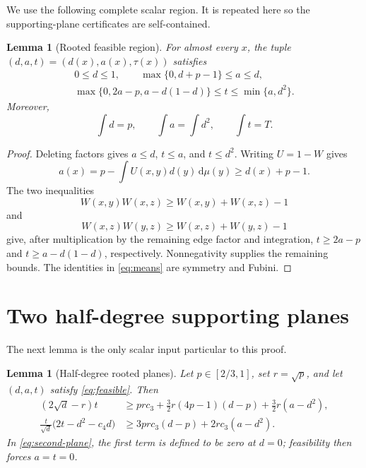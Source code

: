 \documentclass[11pt]{article}
\newtheorem{lemma}[theorem]{Lemma}
\newcommand{\dd}{\,\mathrm d}
\begin{document}
We use the following complete scalar region.  It is repeated here so the
supporting-plane certificates are self-contained.

\begin{lemma}[Rooted feasible region]\label{lem:feasible}
For almost every \(x\), the tuple
\((d,a,t)=(d(x),a(x),\tau(x))\) satisfies
\begin{equation}
\begin{gathered}
 0\leq d\leq1,\qquad
 \max\{0,d+p-1\}\leq a\leq d,\\
 \max\{0,2a-p,a-d(1-d)\}\leq t\leq\min\{a,d^2\}.
\end{gathered}
\label{eq:feasible}
\end{equation}
Moreover,
\begin{equation}
 \int d=p,\qquad
 \int a=\int d^2,\qquad
 \int t=T.
 \label{eq:means}
\end{equation}
\end{lemma}

\begin{proof}
Deleting factors gives \(a\leq d\), \(t\leq a\), and \(t\leq d^2\).
Writing \(U=1-W\) gives
\[
 a(x)=p-\int U(x,y)d(y)\dd\mu(y)\geq d(x)+p-1.
\]
The two inequalities
\[
 W(x,y)W(x,z)\geq W(x,y)+W(x,z)-1
\]
and
\[
 W(x,z)W(y,z)\geq W(x,z)+W(y,z)-1
\]
give, after multiplication by the remaining edge factor and integration,
\(t\geq2a-p\) and \(t\geq a-d(1-d)\), respectively.  Nonnegativity supplies
the remaining bounds.  The identities in \eqref{eq:means} are symmetry and
Fubini.
\end{proof}

\section{Two half-degree supporting planes}

The next lemma is the only scalar input particular to this proof.

\begin{lemma}[Half-degree rooted planes]\label{lem:planes}
Let \(p\in[2/3,1]\), set \(r=\sqrt p\), and let
\((d,a,t)\) satisfy \eqref{eq:feasible}.  Then
\begin{align}
 (2\sqrt d-r)t
 &\geq
 prc_3+\frac32r(4p-1)(d-p)
       +\frac32r(a-d^2),
 \label{eq:first-plane}\\
 \frac{t}{\sqrt d}\bigl(2t-d^2-c_4d\bigr)
 &\geq
 3prc_3(d-p)+2rc_3(a-d^2).
 \label{eq:second-plane}
\end{align}
In \eqref{eq:second-plane}, the first term is defined to be zero at
\(d=0\); feasibility then forces \(a=t=0\).
\end{lemma}
\end{document}

